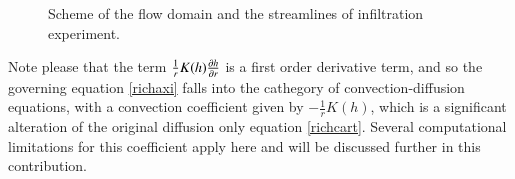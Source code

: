 \documentclass[review,times,3p,10pt]{elsarticle}
\newenvironment{lineq}
    {\begin{linenomath*}
    \begin{equation}
    }
    { 
    \end{equation} 
    \end{linenomath*}
    }
\renewcommand{\vec}{\mathbf}
\begin{document}
{%

 \begin{figure}
\centering
{}
 \caption{Scheme of the flow domain and the streamlines of infiltration experiment. }
 \label{valecproudy}
\end{figure}
Note please that the term $\frac{1}{r}K(h)\pdv{ h}{r}$ is a first order derivative term, and so the governing equation \eqref{richaxi} falls into the cathegory of convection-diffusion equations, with a convection coefficient given by $-\frac{1}{r}K(h)$, which is a significant alteration of the original diffusion only equation \eqref{richcart}. Several computational limitations for this coefficient apply here and will be discussed further in this contribution.

}
\end{document}
